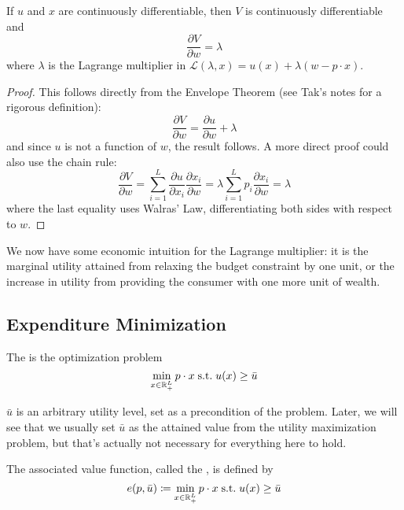 \documentclass[12pt]{article}
\begin{document}
\begin{proposition}
	If $u$ and $x$ are continuously differentiable, then $V$ is continuously differentiable and
	\[
	\frac{\partial V}{\partial w} = \lambda
	\]
	where $\lambda$ is the Lagrange multiplier in $\mathcal{L}(\lambda,x) = u(x) + \lambda(w-p\cdot x)$.
\end{proposition}
\begin{proof}
	This follows directly from the Envelope Theorem (see Tak's notes for a rigorous definition):
	\[
	\frac{\partial V}{\partial w} = \frac{\partial u}{\partial w} + \lambda
	\]
	and since $u$ is not a function of $w$, the result follows. A more direct proof could also use the chain rule:
	\[
	\frac{\partial V}{\partial w} = \sum_{i=1}^L \frac{\partial u}{\partial x_i}\frac{\partial x_i}{\partial w} = \lambda \sum_{i=1}^L p_i \frac{\partial x_i}{\partial w} = \lambda
	\]
	where the last equality uses Walras' Law, differentiating both sides with respect to $w$.
\end{proof}
\begin{remark}
	We now have some economic intuition for the Lagrange multiplier: it is the marginal utility attained from relaxing the budget constraint by one unit, or the increase in utility from providing the consumer with one more unit of wealth.
\end{remark}


\subsection{Expenditure Minimization}

\begin{definition}
	The  is the optimization problem
	\[
	\min_{x \in \mathbb{R}^L_+} p \cdot x \;\text{s.t.}\; u(x) \ge \bar{u}
	\]
\end{definition}

\begin{remark}
	$\bar{u}$ is an arbitrary utility level, set as a precondition of the problem. Later, we will see that we usually set $\bar{u}$ as the attained value from the utility maximization problem, but that's actually not necessary for everything here to hold.
\end{remark}

\begin{definition}
	The associated value function, called the , is defined by
	\[
	e(p,\bar{u}) \coloneqq \min_{x \in \mathbb{R}^L_+} p \cdot x \;\text{s.t.}\; u(x) \ge \bar{u}
	\]
\end{definition}
\end{document}
